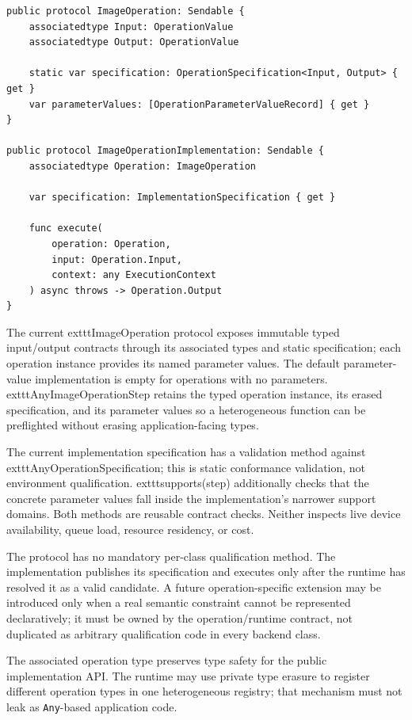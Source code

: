 \documentclass[11pt,a4paper,oneside]{article}
\begin{document}
\begin{lstlisting}
public protocol ImageOperation: Sendable {
    associatedtype Input: OperationValue
    associatedtype Output: OperationValue

    static var specification: OperationSpecification<Input, Output> { get }
    var parameterValues: [OperationParameterValueRecord] { get }
}

public protocol ImageOperationImplementation: Sendable {
    associatedtype Operation: ImageOperation

    var specification: ImplementationSpecification { get }

    func execute(
        operation: Operation,
        input: Operation.Input,
        context: any ExecutionContext
    ) async throws -> Operation.Output
}
\end{lstlisting}

The current 	exttt{ImageOperation} protocol exposes immutable typed input/output contracts through its associated types and static specification; each operation instance provides its named parameter values. The default parameter-value implementation is empty for operations with no parameters. 	exttt{AnyImageOperationStep} retains the typed operation instance, its erased specification, and its parameter values so a heterogeneous function can be preflighted without erasing application-facing types.

The current implementation specification has a validation method against 	exttt{AnyOperationSpecification}; this is static conformance validation, not environment qualification. 	exttt{supports(step)} additionally checks that the concrete parameter values fall inside the implementation's narrower support domains. Both methods are reusable contract checks. Neither inspects live device availability, queue load, resource residency, or cost.

The protocol has no mandatory per-class qualification method. The implementation publishes its specification and executes only after the runtime has resolved it as a valid candidate. A future operation-specific extension may be introduced only when a real semantic constraint cannot be represented declaratively; it must be owned by the operation/runtime contract, not duplicated as arbitrary qualification code in every backend class.

The associated operation type preserves type safety for the public implementation API. The runtime may use private type erasure to register different operation types in one heterogeneous registry; that mechanism must not leak as \texttt{Any}-based application code.
\end{document}
